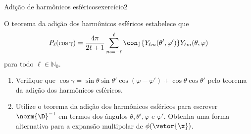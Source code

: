 \begin{exercício}{Adição de harmônicos esféricos}{exercício2}
\begin{center}
    \end{center}
    O teorema da adição dos harmônicos esféricos estabelece que
    \begin{equation*}
        P_\ell(\cos \gamma) = \frac{4\pi}{2\ell + 1} \sum_{m = -\ell}^{\ell} \conj{Y_{\ell m}(\theta', \varphi')}Y_{\ell m}(\theta,\varphi)
    \end{equation*}
    para todo \(\ell \in \mathbb{N}_0\).
    \begin{enumerate}[label=(\alph*)]
        \item Verifique que \(\cos \gamma = \sin\theta \sin\theta' \cos(\varphi - \varphi') + \cos\theta \cos\theta'\) pelo teorema da adição dos harmônicos esféricos.
        \item Utilize o teorema da adição dos harmônicos esféricos para escrever \(\norm{\D}^{-1}\) em termos dos ângulos \(\theta,\theta', \varphi\) e \(\varphi'\). Obtenha uma forma alternativa para a expansão multipolar de \(\phi(\vetor{\x})\).
    \end{enumerate}
\end{exercício}
